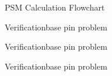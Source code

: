 \documentclass[sans,mathserif,aspectratio=169, 10pt]{beamer}
\begin{document}
\begin{frame}{PSM Calculation Flowchart}
\centering
{}
\end{frame}

\begin{frame}{Verification}{base pin problem}
\centering
{}
\end{frame}

\begin{frame}{Verification}{base pin problem}
\centering
{}
\end{frame}

\begin{frame}{Verification}{base pin problem}
\centering
{}
\end{frame}
\end{document}
